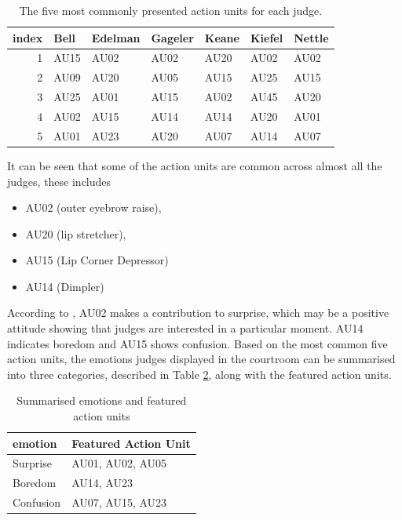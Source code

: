 \documentclass{monashthesis}
\begin{document}
\begin{table}

\caption{\label{tab:most-common-table}\label{tab:most_common}The five most commonly presented action units for each judge.}
\centering
\begin{tabular}[t]{r|l|l|l|l|l|l}
\hline
index & Bell & Edelman & Gageler & Keane & Kiefel & Nettle\\
\hline
1 & AU15 & AU02 & AU02 & AU20 & AU02 & AU02\\
\hline
2 & AU09 & AU20 & AU05 & AU15 & AU25 & AU15\\
\hline
3 & AU25 & AU01 & AU15 & AU02 & AU45 & AU20\\
\hline
4 & AU02 & AU15 & AU14 & AU14 & AU20 & AU01\\
\hline
5 & AU01 & AU23 & AU20 & AU07 & AU14 & AU07\\
\hline
\end{tabular}
\end{table}

It can be seen that some of the action units are common across almost all the judges, these includes

\begin{itemize}
\tightlist
\item
  AU02 (outer eyebrow raise),
\item
  AU20 (lip stretcher),
\item
  AU15 (Lip Corner Depressor)
\item
  AU14 (Dimpler)
\end{itemize}

According to \textcite{ekman2002facial}, AU02 makes a contribution to surprise, which may be a positive attitude showing that judges are interested in a particular moment. AU14 indicates boredom and AU15 shows confusion. Based on the most common five action units, the emotions judges displayed in the courtroom can be summarised into three categories, described in Table \ref{tab:three_category}, along with the featured action units.

\begin{table}

\caption{\label{tab:emotion-table}\label{tab:three_category}Summarised emotions and featured action units}
\centering
\begin{tabular}[t]{l|l}
\hline
emotion & Featured Action Unit\\
\hline
Surprise & AU01, AU02, AU05\\
\hline
Boredom & AU14, AU23\\
\hline
Confusion & AU07, AU15, AU23\\
\hline
\end{tabular}
\end{table}
\end{document}
